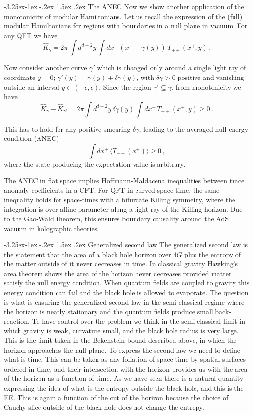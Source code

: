 \documentclass[11pt,a4paper]{article}
\makeatletter
\renewcommand\subsection{\@startsection{subsection}{2}{\z@}%
                                   {-3.25ex\@plus -1ex \@minus -.2ex}%
                                     {1.5ex \@plus .2ex}%
                                     {\normalfont\bfseries}}
\numberwithin{equation}{section}
\newcommand{\be}{\begin{equation}}
\newcommand{\ee}{\end{equation}}
\makeatother
\begin{document}
\subsection{The ANEC}
Now we show another application of the monotonicity of modular Hamiltonians. Let us recall the expression of the (full) modular Hamiltonians for regions with boundaries in a null plane in vacuum. For any QFT we have
\be
\hat{K}_\gamma=2\pi \, \int d^{d-2}y\, \int dx^+\, (x^+-\gamma(y)) \, T_{++}(x^+,y)\,. 
\ee

Now consider another curve $\gamma'$ which is changed only around a single light ray of coordinate $y=0$; $\gamma'(y)=\gamma(y)+\delta\gamma(y)$, with $\delta \gamma>0$ positive and vanishing outside an interval $y\in (-\epsilon,\epsilon)$. Since the region $\gamma'\subseteq \gamma$, from monotonicity we have
\be
\hat{K}_\gamma-\hat{K}_{\gamma'}=2 \pi\int d^{d-2}y\, \delta \gamma(y) \,\int dx^+\,  T_{++}(x^+,y)\ge 0\,.
\ee   

This has to hold for any positive smearing $\delta\gamma$, leading to the averaged null energy condition (ANEC)
\be
\int dx^+\,  \langle T_{++}(x^+)\rangle\ge 0\,,
\ee
where the state producing the expectation value is arbitrary. 

The ANEC in flat space implies Hoffmann-Maldacena inequalities between trace anomaly coefficients in a CFT. For QFT in curved space-time, the same inequality holds for space-times with a bifurcate Killing symmetry, where the integration is over affine parameter along a light ray of the Killing horizon. Due to the Gao-Wald theorem, this ensures boundary causality around the AdS vacuum in holographic theories.  

\subsection{Generalized second law}
The generalized second law is the statement that the area of a black hole horizon over $4G$ plus the entropy of the matter outside of it never decreases in time. In classical gravity  Hawking's area theorem shows the area of the horizon never decreases provided matter satisfy the null energy condition. When quantum fields are coupled to gravity this energy condition can fail and the black hole is allowed to evaporate. The question is what is ensuring the generalized second law in the semi-classical regime where the horizon is nearly stationary and the quantum fields produce small back-reaction.      
To have control over the problem we think in the semi-classical limit in which gravity is weak, curvature small, and the black hole radius is very large. This is the limit taken in the Bekenstein bound described above, in which the horizon approaches the null plane. To express the second law we need to define what is time. This can be taken as any foliation of space-time by spatial surfaces ordered in time, and their intersection with the horizon provides us with the area of the horizon as a function of time.  
As we have seen there is a natural quantity expressing the idea of what is the entropy outside the black hole, and this is the EE. This is again a function of the cut of the horizon because the choice of Cauchy slice outside of the black hole does not change the entropy.      
\end{document}
